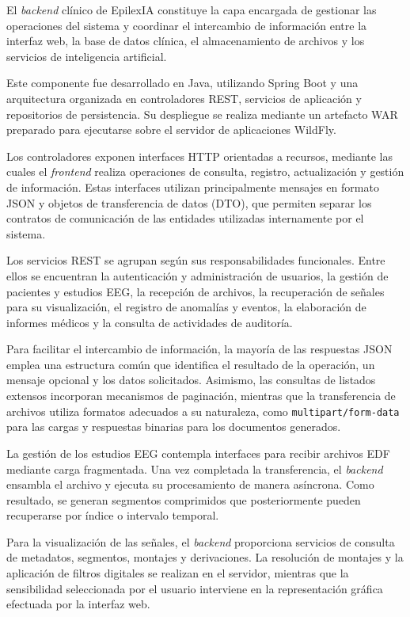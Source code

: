 El \textit{backend} clínico de EpilexIA constituye la capa
encargada de gestionar las operaciones del sistema y
coordinar el intercambio de información entre la interfaz
web, la base de datos clínica, el almacenamiento de
archivos y los servicios de inteligencia artificial.

Este componente fue desarrollado en Java, utilizando
Spring Boot y una arquitectura organizada en controladores
REST, servicios de aplicación y repositorios de
persistencia. Su despliegue se realiza mediante un
artefacto WAR preparado para ejecutarse sobre el
servidor de aplicaciones WildFly.

Los controladores exponen interfaces HTTP orientadas
a recursos, mediante las cuales el \textit{frontend} realiza
operaciones de consulta, registro, actualización y
gestión de información. Estas interfaces utilizan
principalmente mensajes en formato JSON y objetos
de transferencia de datos (DTO), que permiten
separar los contratos de comunicación de las
entidades utilizadas internamente por el sistema.

Los servicios REST se agrupan según sus
responsabilidades funcionales. Entre ellos se
encuentran la autenticación y administración de
usuarios, la gestión de pacientes y estudios EEG,
la recepción de archivos, la recuperación de señales
para su visualización, el registro de anomalías y
eventos, la elaboración de informes médicos y
la consulta de actividades de auditoría.

Para facilitar el intercambio de información,
la mayoría de las respuestas JSON emplea una
estructura común que identifica el resultado de
la operación, un mensaje opcional y los datos
solicitados. Asimismo, las consultas de listados
extensos incorporan mecanismos de paginación,
mientras que la transferencia de archivos utiliza
formatos adecuados a su naturaleza, como
\texttt{multipart/form-data} para las cargas
y respuestas binarias para los documentos generados.

La gestión de los estudios EEG contempla interfaces
para recibir archivos EDF mediante carga
fragmentada. Una vez completada la transferencia,
el \textit{backend} ensambla el archivo y ejecuta su
procesamiento de manera asíncrona. Como resultado,
se generan segmentos comprimidos que posteriormente
pueden recuperarse por índice o intervalo temporal.

Para la visualización de las señales, el \textit{backend}
proporciona servicios de consulta de metadatos,
segmentos, montajes y derivaciones. La resolución
de montajes y la aplicación de filtros digitales
se realizan en el servidor, mientras que la
sensibilidad seleccionada por el usuario interviene
en la representación gráfica efectuada por
la interfaz web.

